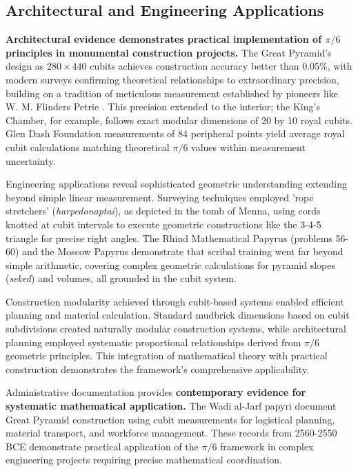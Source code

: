 \documentclass[11pt]{article}
\begin{document}
\subsection{Architectural and Engineering Applications}

\textbf{Architectural evidence demonstrates practical implementation of $\pi/6$ principles in monumental construction projects.} The Great Pyramid's design as $280 \times 440$ cubits achieves construction accuracy better than 0.05\%, with modern surveys confirming theoretical relationships to extraordinary precision, building on a tradition of meticulous measurement established by pioneers like W. M. Flinders Petrie \cite{petrie1883pyramids}. This precision extended to the interior; the King's Chamber, for example, follows exact modular dimensions of 20 by 10 royal cubits. Glen Dash Foundation measurements of 84 peripheral points yield average royal cubit calculations matching theoretical $\pi/6$ values within measurement uncertainty.

Engineering applications reveal sophisticated geometric understanding extending beyond simple linear measurement. Surveying techniques employed 'rope stretchers' (\textit{harpedonaptai}), as depicted in the tomb of Menna, using cords knotted at cubit intervals to execute geometric constructions like the 3-4-5 triangle for precise right angles. The Rhind Mathematical Papyrus (problems 56-60) and the Moscow Papyrus demonstrate that scribal training went far beyond simple arithmetic, covering complex geometric calculations for pyramid slopes (\textit{seked}) and volumes, all grounded in the cubit system.

Construction modularity achieved through cubit-based systems enabled efficient planning and material calculation. Standard mudbrick dimensions based on cubit subdivisions created naturally modular construction systems, while architectural planning employed systematic proportional relationships derived from $\pi/6$ geometric principles. This integration of mathematical theory with practical construction demonstrates the framework's comprehensive applicability.

Administrative documentation provides \textbf{contemporary evidence for systematic mathematical application.} The Wadi al-Jarf papyri document Great Pyramid construction using cubit measurements for logistical planning, material transport, and workforce management. These records from 2560-2550 BCE demonstrate practical application of the $\pi/6$ framework in complex engineering projects requiring precise mathematical coordination.
\end{document}
